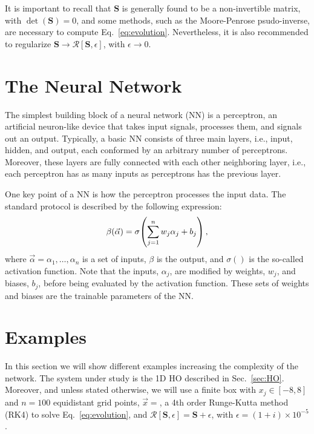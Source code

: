 \documentclass[aps,pre,superscriptaddress,amsmath,amssymb,amsfonts,twocolumn,showpacs,notitlepage]{revtex4-1}
\begin{document}
	It is important to recall that $\bm{S}$ is generally found to be a non-invertible matrix, with $\det(\bm{S})=0$, and some methods, such as the Moore-Penrose psudo-inverse, are necessary to compute Eq.~\eqref{eq:evolution}.
	Nevertheless, it is also recommended to regularize $\bm{S}\to\mathcal{R}[\bm{S},\epsilon]$, with $\epsilon\to0$. 

\section{The Neural Network} \label{sec:NN}

	The simplest building block of a neural network (NN) is a perceptron, an artificial neuron-like device that takes input signals, processes them, and signals out an output.
	Typically, a basic NN consists of three main layers, i.e., input, hidden, and output, each conformed by an arbitrary number of perceptrons.
	Moreover, these layers are fully connected with each other neighboring layer, i.e., each perceptron has as many inputs as perceptrons has the previous layer.
	
	One key point of a NN is how the perceptron processes the input data.
	The standard protocol is described by the following expression:
	\begin{equation} \label{eq:perceptron}
		\beta(\vec{\alpha}) = \sigma\qty(\sum_{j=1}^n w_j\alpha_j + b_j) \,,
	\end{equation}
	where $\vec{\alpha}={\alpha_1,\dots,\alpha_n}$ is a set of inputs, $\beta$ is the output, and $\sigma()$ is the so-called activation function.
	Note that the inputs, $\alpha_j$, are modified by weights, $w_j$, and biases, $b_j$, before being evaluated by the activation function.
	These sets of weights and biases are the trainable parameters of the NN.
	
	
\section{Examples} \label{sec:examples}

	In this section we will show different examples increasing the complexity of the network.
	The system under study is the 1D HO described in Sec.~\ref{sec:HO}.
	Moreover, and unless stated otherwise, we will use a finite box with $x_j\in[-8, 8]$ and $n=100$ equidistant grid points, $\vec{x}=$, a 4th order Runge-Kutta method (RK4) to solve Eq.~\eqref{eq:evolution}, and $\mathcal{R}[\bm{S},\epsilon]=\bm{S}+\epsilon$, with $\epsilon=(1+i)\times10^{-5}$.
	
\end{document}

